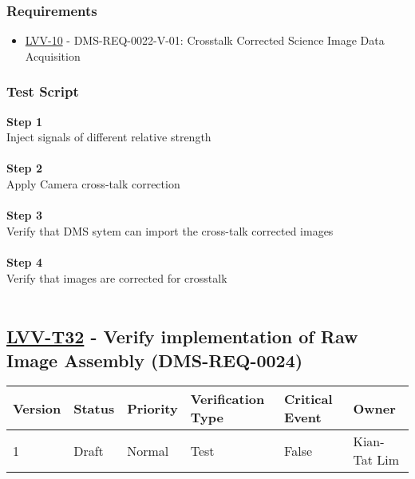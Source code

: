 \hypertarget{requirements-8}{%
\subsubsection{Requirements}\label{requirements-8}}

\begin{itemize}
\tightlist
\item
  \href{https://jira.lsstcorp.org/browse/LVV-10}{LVV-10} -
  DMS-REQ-0022-V-01: Crosstalk Corrected Science Image Data Acquisition
\end{itemize}

\hypertarget{test-script-8}{%
\subsubsection{Test Script}\label{test-script-8}}

\textbf{Step 1}\\
Inject signals of different relative strength\\
~\\
\textbf{Step 2}\\
Apply Camera cross-talk correction\\
~\\
\textbf{Step 3}\\
Verify that DMS sytem can import the cross-talk corrected images\\
~\\
\textbf{Step 4}\\
Verify that images are corrected for crosstalk\\
~\\

\hypertarget{lvv-t32---verify-implementation-of-raw-image-assembly-dms-req-0024}{%
\subsection{\texorpdfstring{\href{https://jira.lsstcorp.org/secure/Tests.jspa\#/testCase/LVV-T32}{LVV-T32}
- Verify implementation of Raw Image Assembly
(DMS-REQ-0024)}{LVV-T32 - Verify implementation of Raw Image Assembly (DMS-REQ-0024)}}\label{lvv-t32---verify-implementation-of-raw-image-assembly-dms-req-0024}}

\begin{longtable}[]{@{}llllll@{}}
\toprule
Version & Status & Priority & Verification Type & Critical Event &
Owner\tabularnewline
\midrule
\endhead
1 & Draft & Normal & Test & False & Kian-Tat Lim\tabularnewline
\bottomrule
\end{longtable}

